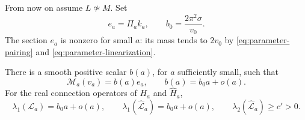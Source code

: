 From now on assume \(L\not\simeq M\). Set
\begin{equation}\label{eq:scalar-coefficient}
 e_a=\Pi_ak_a,\qquad b_0=\frac{2\pi^2\sigma}{v_0}.
\end{equation}
The section \(e_a\) is nonzero for small \(a\): its mass tends
to \(2v_0\) by \eqref{eq:parameter-pairing} and
\eqref{eq:parameter-linearization}.

\begin{proposition}\label{prop:sharp-small-eigenvalue}
There is a smooth positive scalar \(b(a)\), for \(a\)
sufficiently small, such that
\begin{equation}\label{eq:remaining-scalar-curvature}
 \mathcal M_a(v_a)=b(a)e_a,\qquad b(a)=b_0a+o(a).
\end{equation}
For the real connection operators of \(H_a\) and
\(\widehat H_a\),
\begin{equation}\label{eq:sharp-small-eigenvalue}
 \lambda_1(\mathcal L_a)=b_0a+o(a),\qquad
 \lambda_1(\widehat{\mathcal L}_a)=b_0a+o(a),\qquad
 \lambda_2(\widehat{\mathcal L}_a)\ge c'>0.
\end{equation}
\end{proposition}

